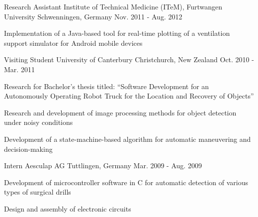 \begin{cventries}
    \cventry
      {Research Assistant} %
      {Institute of Technical Medicine (ITeM), Furtwangen University} %
      {Schwenningen, Germany} %
      {Nov. 2011 - Aug. 2012} %
      {
        \begin{cvitems}
          \item {Implementation of a Java-based tool for real-time plotting of a ventilation support simulator for Android mobile devices}
        \end{cvitems}
      }

  \cventry
    {Visiting Student} %
    {University of Canterbury} %
    {Christchurch, New Zealand} %
    {Oct. 2010 - Mar. 2011} %
    {
      \begin{cvitems}
        \item {Research for Bachelor's thesis titled:} ``Software Development for an Autonomously Operating Robot Truck for the Location and Recovery of Objects''
        \item {Research and development of image processing methods for object detection under noisy conditions}
        \item {Development of a state-machine-based algorithm for automatic maneuvering and decision-making}
      \end{cvitems}
    }

  \cventry
  {Intern} %
  {Aesculap AG} %
  {Tuttlingen, Germany} %
  {Mar. 2009 - Aug. 2009} %
  {
    \begin{cvitems}
      \item {Development of microcontroller software in C for automatic detection of various types of surgical drills}
      \item {Design and assembly of electronic circuits}
    \end{cvitems}
  }

\end{cventries}
